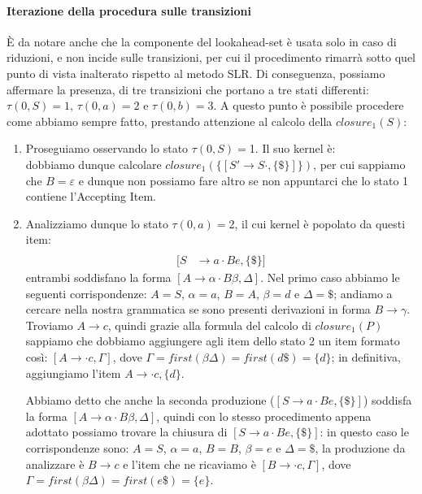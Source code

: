 \documentclass[class=book, crop=false, oneside, 12pt]{standalone}
\begin{document}
\paragraph{Iterazione della procedura sulle transizioni}
È da notare anche che la componente del lookahead-set è usata solo in caso di riduzioni, e non incide sulle transizioni, per cui il procedimento rimarrà sotto quel punto di vista inalterato rispetto al metodo SLR. Di conseguenza, possiamo affermare la presenza, di tre transizioni che portano a tre stati differenti: \(\tau(0,S)=1 \textrm{, } \tau(0,a)=2 \textrm{ e } \tau(0,b)=3\). A questo punto è possibile procedere come abbiamo sempre fatto, prestando attenzione al calcolo della \(closure_1(S)\):
\begin{enumerate}
    \item Proseguiamo osservando lo stato \(\tau(0, S)=\)1. Il suo kernel è:
    \begin{equation*}
        [S' \to S \cdot, \{\$\}]
    \end{equation*}
    dobbiamo dunque calcolare \(closure_1(\{[S' \to S \cdot, \{\$\}]\})\), per cui sappiamo che \(B = \varepsilon\) e dunque non possiamo fare altro se non appuntarci che lo stato 1 contiene l'Accepting Item.
    \item Analizziamo dunque lo stato \(\tau(0, a)=\)2, il cui kernel è popolato da questi item:
    \begin{align*}
        [S &\to a \cdot Ad, \{\$\}] \\
        [S &\to a \cdot Be, \{\$\}]
    \end{align*}
    entrambi soddisfano la forma \([A \rightarrow \alpha \cdot B \beta, \Delta]\).
    Nel primo caso abbiamo le seguenti corrispondenze: \(A=S\), \(\alpha = a\), \(B = A\), \(\beta = d\) e \(\Delta=\$\); andiamo a cercare nella nostra grammatica se sono presenti derivazioni in forma \(B \to \gamma\). Troviamo \(A \to c\), quindi grazie alla formula del calcolo di \(closure_1(P)\) sappiamo che dobbiamo aggiungere agli item dello stato 2 un item formato così: \([A \to \cdot c, {\Gamma}]\), dove \(\Gamma = first(\beta\Delta) = first(d\$) = \{d\}\); in definitiva, aggiungiamo l'item \(A \to \cdot c, \{d\}\).

    Abbiamo detto che anche la seconda produzione (\([S \to a \cdot Be, \{\$\}]\)) soddisfa la forma \([A \rightarrow \alpha \cdot B \beta, \Delta]\), quindi con lo stesso procedimento appena adottato possiamo trovare la chiusura di \([S \to a \cdot Be, \{\$\}]\): in questo caso le corrispondenze sono: \(A=S\), \(\alpha=a\), \(B=B\), \(\beta=e\) e \(\Delta=\$\), la produzione da analizzare è \(B \to c\) e l'item che ne ricaviamo è \([B \to \cdot c, {\Gamma}]\), dove \(\Gamma = first(\beta\Delta) = first(e\$) = \{e\}\).
    

\end{enumerate}
\end{document}
